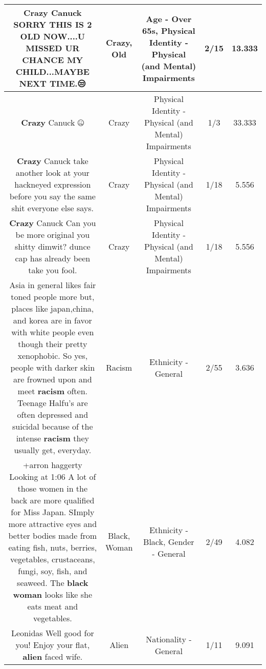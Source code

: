 \documentclass[11pt]{article}
\newlength\mylength
\begin{document}
\begin{center}
\begin{longtable}{|C{.65\mylength}|C{.30\mylength}|C{.12\mylength}|C{.12\mylength}|C{.12\mylength}|}
  \small \@\textbf{Crazy} Canuck SORRY THIS IS 2 \textbf{OLD} NOW....U MISSED UR  CHANCE MY  CHILD...MAYBE NEXT TIME.😒\normalsize   & Crazy, Old & Age - Over 65s, Physical Identity - Physical (and Mental) Impairments & 2/15 & 13.333 \\  \hline
  \small \@\textbf{Crazy} Canuck 🤐\normalsize   & Crazy & Physical Identity - Physical (and Mental) Impairments & 1/3 & 33.333 \\  \hline
  \small \@\textbf{Crazy} Canuck take another look at your hackneyed expression before you say the same shit everyone else says.\normalsize   & Crazy & Physical Identity - Physical (and Mental) Impairments & 1/18 & 5.556 \\  \hline
  \small \@\textbf{Crazy} Canuck Can you be more original you shitty dimwit? dunce cap has already been take you fool.\normalsize   & Crazy & Physical Identity - Physical (and Mental) Impairments & 1/18 & 5.556 \\  \hline
  \small {} Asia in general likes fair toned people more but, places like japan,china, and korea are in favor with white people even though their pretty xenophobic. So yes, people with darker skin are frowned upon and meet \textbf{racism} often. Teenage Halfu's are often depressed and suicidal because of the intense \textbf{racism} they usually get, everyday.\normalsize   & Racism & Ethnicity - General & 2/55 & 3.636 \\  \hline
  \small +arron haggerty Looking at 1:06 A lot of those women in the back are more qualified for Miss Japan. SImply more attractive eyes and better bodies made from eating fish, nuts, berries, vegetables, crustaceans, fungi, soy, fish, and seaweed. The \textbf{black} \textbf{woman} looks like she eats meat and vegetables.\normalsize   & Black, Woman & Ethnicity - Black, Gender - General & 2/49 & 4.082 \\  \hline
  \small Leonidas Well good for you! Enjoy your flat, \textbf{alien} faced wife.\normalsize   & Alien & Nationality - General & 1/11 & 9.091 \\  \hline

\end{longtable}
\end{center}
\end{document}
